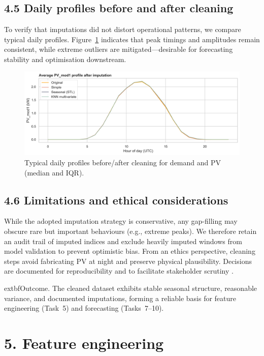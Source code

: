 \documentclass[12pt,a4paper]{article}
\begin{document}
\subsection*{4.5 Daily profiles before and after cleaning}
To verify that imputations did not distort operational patterns, we compare typical daily profiles. Figure~\ref{fig:task4_daily_profiles} indicates that peak timings and amplitudes remain consistent, while extreme outliers are mitigated—desirable for forecasting stability and optimisation downstream.

\begin{figure}[H]
  \centering
  \includegraphics[width=0.9\linewidth]{task4_fig_daily_profiles.png}
  \caption{Typical daily profiles before/after cleaning for demand and PV (median and IQR).}
  \label{fig:task4_daily_profiles}
\end{figure}

\subsection*{4.6 Limitations and ethical considerations}
While the adopted imputation strategy is conservative, any gap-filling may obscure rare but important behaviours (e.g., extreme peaks). We therefore retain an audit trail of imputed indices and exclude heavily imputed windows from model validation to prevent optimistic bias. From an ethics perspective, cleaning steps avoid fabricating PV at night and preserve physical plausibility. Decisions are documented for reproducibility and to facilitate stakeholder scrutiny \cite{Little2002,Hyndman2021}.

\bigskip

	extbf{Outcome.} The cleaned dataset exhibits stable seasonal structure, reasonable variance, and documented imputations, forming a reliable basis for feature engineering (Task~5) and forecasting (Tasks~7--10).

\section*{5. Feature engineering}
\end{document}
